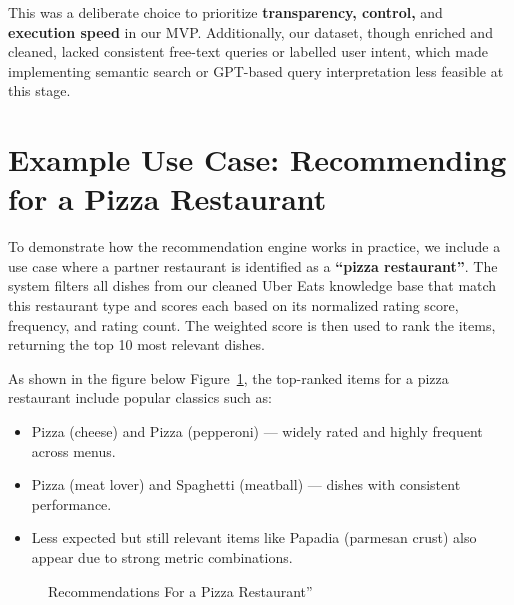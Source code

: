 \documentclass[
  11pt,
  a4paper,
  DIV=11,
  numbers=noendperiod]{scrartcl}
\providecommand{\tightlist}{%
  \setlength{\itemsep}{0pt}\setlength{\parskip}{0pt}}\usepackage{longtable,booktabs,array}
\begin{document}
This was a deliberate choice to prioritize \textbf{transparency,
control,} and \textbf{execution speed} in our MVP. Additionally, our
dataset, though enriched and cleaned, lacked consistent free-text
queries or labelled user intent, which made implementing semantic search
or GPT-based query interpretation less feasible at this stage.

\section{Example Use Case: Recommending for a Pizza
Restaurant}\label{example-use-case-recommending-for-a-pizza-restaurant}

To demonstrate how the recommendation engine works in practice, we
include a use case where a partner restaurant is identified as a
\textbf{``pizza restaurant''}. The system filters all dishes from our
cleaned Uber Eats knowledge base that match this restaurant type and
scores each based on its normalized rating score, frequency, and rating
count. The weighted score is then used to rank the items, returning the
top 10 most relevant dishes.

As shown in the figure below Figure~\ref{fig-rec-example}, the
top-ranked items for a pizza restaurant include popular classics such
as:

\begin{itemize}
\tightlist
\item
  Pizza (cheese) and Pizza (pepperoni) --- widely rated and highly
  frequent across menus.
\item
  Pizza (meat lover) and Spaghetti (meatball) --- dishes with consistent
  performance.
\item
  Less expected but still relevant items like Papadia (parmesan crust)
  also appear due to strong metric combinations.
\end{itemize}

\begin{figure}

\caption{\label{fig-rec-example}Recommendations For a Pizza
Restaurant''}


\end{figure}%
\end{document}
